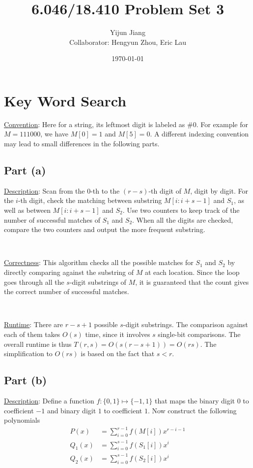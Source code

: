 \documentclass{article}
\title{6.046/18.410 Problem Set 3}
\author{Yijun Jiang\\Collaborator: Hengyun Zhou, Eric Lau}
\date{\today}
\begin{document}
\maketitle

\section{Key Word Search}
\noindent\underline{Convention}: Here for a string, its leftmost digit is labeled as \#0. For example for $M=111000$, we have $M[0]=1$ and $M[5]=0$. A different indexing convention may lead to small differences in the following parts.

\subsection{Part (a)}
\noindent\underline{Description}: Scan from the 0-th to the $(r-s)$-th digit of $M$, digit by digit. For the $i$-th digit, check the matching between substring $M[i:i+s-1]$ and $S_1$, as well as between $M[i:i+s-1]$ and $S_2$. Use two counters to keep track of the number of successful matches of $S_1$ and $S_2$. When all the digits are checked, compare the two counters and output the more frequent substring.

~

\noindent\underline{Correctness}: This algorithm checks all the possible matches for $S_1$ and $S_2$ by directly comparing against the substring of $M$ at each location. Since the loop goes through all the $s$-digit substrings of $M$, it is guaranteed that the count gives the correct number of successful matches.

~

\noindent\underline{Runtime}: There are $r-s+1$ possible $s$-digit substrings. The comparison against each of them takes $O(s)$ time, since it involves $s$ single-bit comparisons. The overall runtime is thus $T(r,s)=O(s(r-s+1))=O(rs)$. The simplification to $O(rs)$ is based on the fact that $s<r$.

\subsection{Part (b)}
\noindent\underline{Description}: Define a function $f:\{0,1\}\mapsto\{-1,1\}$ that maps the binary digit $0$ to coefficient $-1$ and binary digit $1$ to coefficient $1$. Now construct the following polynomials
\begin{align*}
P(x)&=\sum_{i=0}^{r-1}f(M[i])x^{r-i-1}\\
Q_1(x)&=\sum_{i=0}^{s-1}f(S_1[i])x^i\\
Q_2(x)&=\sum_{i=0}^{s-1}f(S_2[i])x^i
\end{align*}
\end{document}
